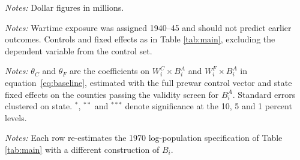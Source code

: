 \documentclass[12pt]{article}
\newcommand{\fittab}[1]{%
  \sbox{\tabbox}{#1}%
  \ifdim\wd\tabbox>\textwidth
    \resizebox{\textwidth}{!}{\usebox{\tabbox}}%
  \else\usebox{\tabbox}\fi}
\begin{document}
\begin{table}[p]
\centering
\caption{The twenty largest contract-receiving counties}
\label{tab:top20}
\resizebox{\textwidth}{!}{}
\vspace{2pt}
\begin{minipage}{\textwidth}\footnotesize \textit{Notes:} Dollar figures in millions.\end{minipage}
\end{table}

\begin{table}[p]
\centering
\caption{Pre-trend falsification: wartime exposure against pre-1940 outcomes}
\label{tab:pretrends}
\fittab{}
\vspace{2pt}
\begin{minipage}{\textwidth}\footnotesize \textit{Notes:} Wartime exposure was assigned 1940--45 and should not predict earlier outcomes. Controls and fixed effects as in Table \ref{tab:main}, excluding the dependent variable from the control set.\end{minipage}
\end{table}

\begin{table}[p]
\centering
\caption{The interactions of equation~\eqref{eq:baseline}}
\label{tab:interactions}
\fittab{}
\vspace{2pt}
\begin{minipage}{\textwidth}\footnotesize \textit{Notes:} $\theta_C$ and
$\theta_F$ are the coefficients on $W^C_i \times B_i^{A}$ and $W^F_i \times
B_i^{A}$ in equation~\eqref{eq:baseline}, estimated with the full prewar control
vector and state fixed effects on the counties passing the validity screen for
$B_i^{A}$. Standard errors clustered on state. $^{*}$, $^{**}$ and $^{***}$
denote significance at the 10, 5 and 1 percent levels.\end{minipage}
\end{table}

\begin{table}[p]
\centering
\caption{Alternative denominators for fatal burden}
\label{tab:burden}
\fittab{}
\vspace{2pt}
\begin{minipage}{\textwidth}\footnotesize \textit{Notes:} Each row re-estimates the 1970 log-population specification of Table \ref{tab:main} with a different construction of $B_i$.\end{minipage}
\end{table}
\end{document}
